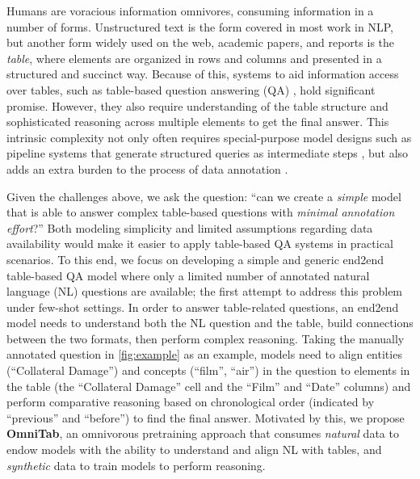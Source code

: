 \documentclass[11pt]{article}
\def\ours{OmniTab\xspace}
\begin{document}
Humans are voracious information omnivores, consuming information in a number of forms.
Unstructured text is the form covered in most work in NLP, but another form widely used on the web, academic papers, and reports is the \emph{table}, where elements are organized in rows and columns and presented in a structured and succinct way.
Because of this, systems to aid information access over tables, such as table-based question answering (QA) \cite{wtq-2015-pasupat,sqa-2017-iyyer,wikisql-2017-zhong}, hold significant promise.
However, they also require understanding of the table structure and sophisticated reasoning across multiple elements to get the final answer.
This intrinsic complexity not only often requires special-purpose model designs such as pipeline systems that generate structured queries as intermediate steps \cite{liang-2018-mapo,wang-2019-latent,tabert-2020-yin,yu-grappa-2021}, but also adds an extra burden to the process of data annotation \cite{wtq-2015-pasupat,shi-2020-squall}.

Given the challenges above, we ask the question: ``can we create a \emph{simple} model that is able to answer complex table-based questions with \emph{minimal annotation effort}?''
Both modeling simplicity and limited assumptions regarding data availability would make it easier to apply table-based QA systems in practical scenarios.
To this end, we focus on developing a simple and generic end2end table-based QA model where only a limited number of annotated natural language (NL) questions are available; the first attempt to address this problem under few-shot settings.
In order to answer table-related questions, an end2end model needs to understand both the NL question and the table, build connections between the two formats, then perform complex reasoning.
Taking the manually annotated question in \autoref{fig:example} as an example, models need to align entities (``Collateral Damage'') and concepts (``film'', ``air'') in the question to elements in the table (the ``Collateral Damage'' cell and the ``Film'' and ``Date'' columns) and perform comparative reasoning based on chronological order (indicated by ``previous'' and ``before'') to find the final answer.
Motivated by this, we propose \textbf{\ours}, an omnivorous pretraining approach that consumes \emph{natural} data to endow models with the ability to understand and align NL with tables, and \emph{synthetic} data to train models to perform reasoning.
\end{document}
